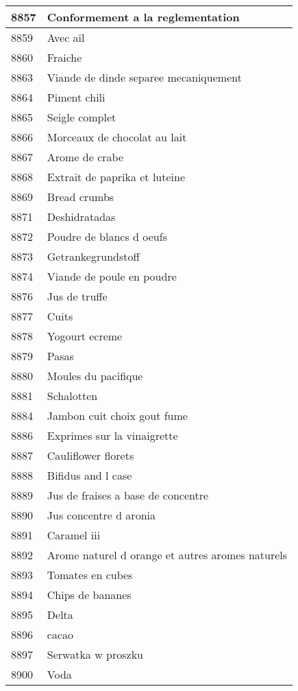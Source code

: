 \begin{longtable}{|l|l|}
8857 & Conformement a la reglementation \\ \hline 
8859 & Avec ail \\ \hline 
8860 & Fraiche \\ \hline 
8863 & Viande de dinde separee mecaniquement \\ \hline 
8864 & Piment chili \\ \hline 
8865 & Seigle complet \\ \hline 
8866 & Morceaux de chocolat au lait \\ \hline 
8867 & Arome de crabe \\ \hline 
8868 & Extrait de paprika et luteine \\ \hline 
8869 & Bread crumbs \\ \hline 
8871 & Deshidratadas \\ \hline 
8872 & Poudre de blancs d oeufs \\ \hline 
8873 & Getrankegrundstoff \\ \hline 
8874 & Viande de poule en poudre \\ \hline 
8876 & Jus de truffe \\ \hline 
8877 & Cuits \\ \hline 
8878 & Yogourt ecreme \\ \hline 
8879 & Pasas \\ \hline 
8880 & Moules du pacifique \\ \hline 
8881 & Schalotten \\ \hline 
8884 & Jambon cuit choix gout fume \\ \hline 
8886 & Exprimes sur la vinaigrette \\ \hline 
8887 & Cauliflower florets \\ \hline 
8888 & Bifidus and l case \\ \hline 
8889 & Jus de fraises a base de concentre \\ \hline 
8890 & Jus concentre d aronia \\ \hline 
8891 & Caramel iii \\ \hline 
8892 & Arome naturel d orange et autres aromes naturels \\ \hline 
8893 & Tomates en cubes \\ \hline 
8894 & Chips de bananes \\ \hline 
8895 & Delta \\ \hline 
8896 & cacao \\ \hline 
8897 & Serwatka w proszku \\ \hline 
8900 & Voda \\ \hline 

\end{longtable}
